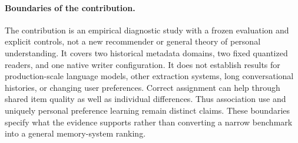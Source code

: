 \paragraph{Boundaries of the contribution.}
The contribution is an empirical diagnostic study with a frozen evaluation and explicit controls, not a new recommender or general theory of personal understanding. It covers two historical metadata domains, two fixed quantized readers, and one native writer configuration. It does not establish results for production-scale language models, other extraction systems, long conversational histories, or changing user preferences. Correct assignment can help through shared item quality as well as individual differences. Thus association use and uniquely personal preference learning remain distinct claims. These boundaries specify what the evidence supports rather than converting a narrow benchmark into a general memory-system ranking.
